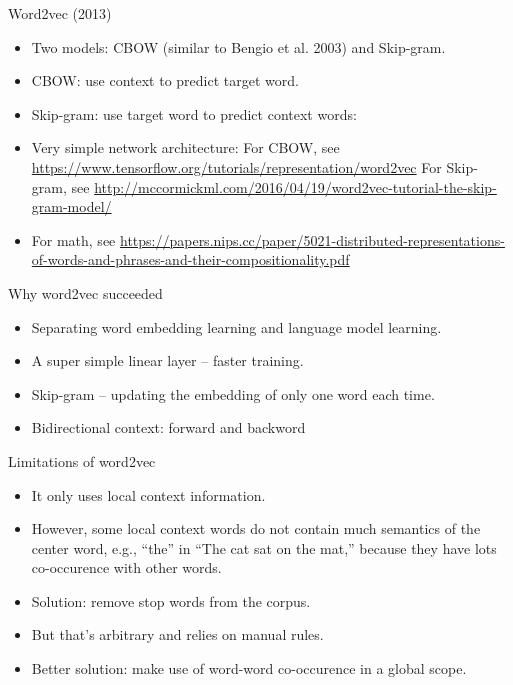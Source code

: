 \documentclass[10pt]{beamer}
\begin{document}
\begin{frame}{Word2vec (2013)}
\begin{itemize}[<+->]
 \item Two models: CBOW (similar to Bengio et al. 2003) and Skip-gram. 
 \item CBOW: use context to predict target word.  
 \item Skip-gram: use target word to predict context words: 
 \item Very simple network architecture: For CBOW, see \url{https://www.tensorflow.org/tutorials/representation/word2vec} For Skip-gram, see \url{http://mccormickml.com/2016/04/19/word2vec-tutorial-the-skip-gram-model/}
 \item For math, see \url{https://papers.nips.cc/paper/5021-distributed-representations-of-words-and-phrases-and-their-compositionality.pdf}
\end{itemize}
\end{frame}

\begin{frame}{Why word2vec succeeded}
\begin{itemize}[<+->]
   \item Separating word embedding learning and language model learning. 
   \item A super simple linear layer -- faster training. 
   \item Skip-gram -- updating the embedding of only one word each time. 
   \item Bidirectional context: forward and backword 
\end{itemize}
\end{frame}

\begin{frame}{Limitations of word2vec}
\begin{itemize}[<+->]
   \item It only uses local context information. 
   \item However, some local context words do not contain much semantics of the center word, e.g., ``the'' in ``The cat sat on the mat,'' because they have lots co-occurence with other words. 
   \item Solution: remove stop words from the corpus. 
   \item But that's arbitrary and relies on manual rules. 
   \item Better solution: make use of word-word co-occurence in a global scope. 
\end{itemize}
\end{frame}
\end{document}
